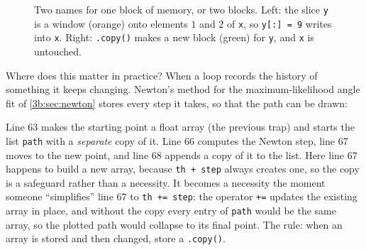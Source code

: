 \begin{figure}[htbp]
\centering
{}
\caption{Two names for one block of memory, or two blocks. Left: the slice \texttt{y} is a window (orange) onto elements $1$ and $2$ of \texttt{x}, so \texttt{y[:] = 9} writes into \texttt{x}. Right: \texttt{.copy()} makes a new block (green) for \texttt{y}, and \texttt{x} is untouched.}
\label{T0a:fig:view}
\end{figure}

Where does this matter in practice? When a loop records the history of something it keeps changing. Newton's method for the maximum-likelihood angle fit of \cref{3b:sec:newton} stores every step it takes, so that the path can be drawn:


Line 63 makes the starting point a float array (the previous trap) and starts the list \texttt{path} with a \emph{separate} copy of it. Line 66 computes the Newton step, line 67 moves to the new point, and line 68 appends a copy of it to the list. Here line 67 happens to build a new array, because \texttt{th + step} always creates one, so the copy is a safeguard rather than a necessity. It becomes a necessity the moment someone ``simplifies'' line 67 to \texttt{th += step}: the operator \texttt{+=} updates the existing array in place, and without the copy every entry of \texttt{path} would be the same array, so the plotted path would collapse to its final point. The rule: when an array is stored and then changed, store a \texttt{.copy()}.

